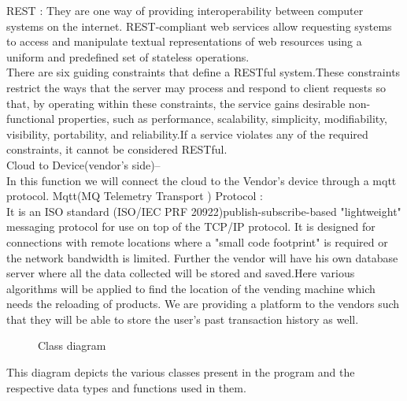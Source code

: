 \documentclass[oneside,a4paper,12pt]{report}
\begin{document}
REST : They are one way of providing interoperability between computer systems on the internet. REST-compliant web services allow requesting systems to access and manipulate textual representations of web resources using a uniform and predefined set of stateless operations.  \\
There are six guiding constraints that define a RESTful system.These constraints restrict the ways that the server may process and respond to client requests so that, by operating within these constraints, the service gains desirable non-functional properties, such as performance, scalability, simplicity, modifiability, visibility, portability, and reliability.If a service violates any of the required constraints, it cannot be considered RESTful.\\

Cloud to Device(vendor's side)--\\
In this function we will connect the cloud to the Vendor's device through a mqtt protocol.
Mqtt(MQ Telemetry Transport ) Protocol :\\
It is an ISO standard (ISO/IEC PRF 20922)publish-subscribe-based "lightweight" messaging protocol for use on top of the TCP/IP protocol. It is designed for connections with remote locations where a "small code footprint" is required or the network bandwidth is limited.
Further the vendor will have his own database server where all the data collected will be stored and saved.Here various algorithms will be applied to find the location of the vending machine which needs the reloading of products.
We are providing a platform to the vendors such that they will be able to store the user's past transaction history as well.\\


\begin{center}
	\begin{figure}[!htbp]
		\centering
	  \caption{Class diagram}
	  \label{fig:act-dig}
	\end{figure}
\end{center}  
\newpage 
This diagram depicts the various classes present in the program and the respective data types and functions used in them.\\
\end{document}
